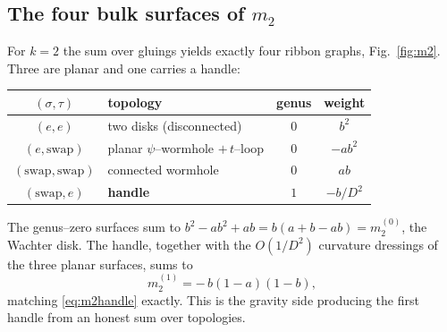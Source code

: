 \documentclass[11pt]{article}
\newif\ifpedagogical
\newcommand{\ped}[1]{\ifpedagogical\par\smallskip{\small\color{pedcol}%
  \leftskip=1.4em\rightskip=1.4em\noindent$\triangleright$~\textit{Plain-language aside.}~#1\par}%
  \par\smallskip\fi}
\begin{document}
\subsection{The four bulk surfaces of $m_2$}
For $k=2$ the sum over gluings yields exactly four ribbon graphs, Fig.~\ref{fig:m2}. Three are
planar and one carries a handle:
\begin{center}
\begin{tabular}{clcc}
\hline
$(\sigma,\tau)$ & topology & genus & weight\\
\hline
$(e,e)$ & two disks (disconnected) & $0$ & $b^2$\\
$(e,\text{swap})$ & planar $\psi$--wormhole $+\,t$--loop & $0$ & $-ab^2$\\
$(\text{swap},\text{swap})$ & connected wormhole & $0$ & $ab$\\
$(\text{swap},e)$ & \textbf{handle} & $1$ & $-b/D^2$\\
\hline
\end{tabular}
\end{center}
\ped{``Ribbon graph'' and ``genus,'' concretely. Draw the four ways the two $\psi$--branes and two
$t$--branes can be paired up and fatten the lines into ribbons; each way is a little surface. Three
of them lie flat in the plane (genus $0$, no handles); the fourth can only be drawn by letting a
ribbon cross over itself, which forces a handle (genus $1$). The genus is literally the number of
handles, and each handle costs a factor $1/D^2$.}
The genus--zero surfaces sum to $b^2-ab^2+ab=b(a+b-ab)=m_2^{(0)}$, the Wachter disk. The handle,
together with the $O(1/D^2)$ curvature dressings of the three planar surfaces, sums to
\begin{equation}
  m_2^{(1)} = -\,b(1-a)(1-b) ,
\end{equation}
matching \eqref{eq:m2handle} exactly. This is the gravity side producing the first handle from an
honest sum over topologies.
\end{document}
